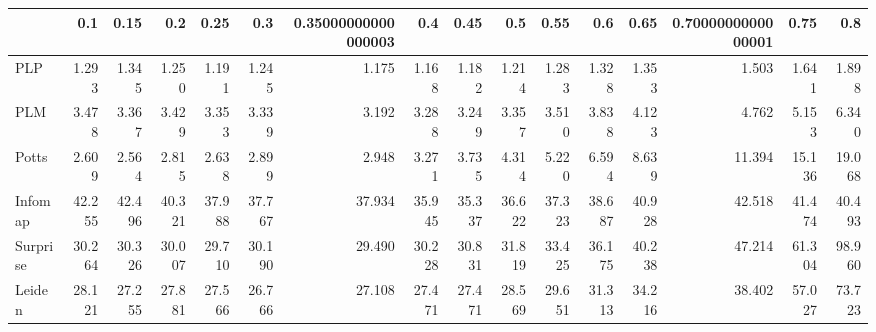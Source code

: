 \begin{tabular}{lrrrrrrrrrrrrrrr}
\toprule
{} &    0.1 &   0.15 &    0.2 &   0.25 &    0.3 & 0.35000000000000003 &    0.4 &   0.45 &    0.5 &   0.55 &    0.6 &   0.65 & 0.7000000000000001 &   0.75 &    0.8 \\
\midrule
PLP      &  1.293 &  1.345 &  1.250 &  1.191 &  1.245 &               1.175 &  1.168 &  1.182 &  1.214 &  1.283 &  1.328 &  1.353 &              1.503 &  1.641 &  1.898 \\
PLM      &  3.478 &  3.367 &  3.429 &  3.353 &  3.339 &               3.192 &  3.288 &  3.249 &  3.357 &  3.510 &  3.838 &  4.123 &              4.762 &  5.153 &  6.340 \\
Potts    &  2.609 &  2.564 &  2.815 &  2.638 &  2.899 &               2.948 &  3.271 &  3.735 &  4.314 &  5.220 &  6.594 &  8.639 &             11.394 & 15.136 & 19.068 \\
Infomap  & 42.255 & 42.496 & 40.321 & 37.988 & 37.767 &              37.934 & 35.945 & 35.337 & 36.622 & 37.323 & 38.687 & 40.928 &             42.518 & 41.474 & 40.493 \\
Surprise & 30.264 & 30.326 & 30.007 & 29.710 & 30.190 &              29.490 & 30.228 & 30.831 & 31.819 & 33.425 & 36.175 & 40.238 &             47.214 & 61.304 & 98.960 \\
Leiden   & 28.121 & 27.255 & 27.881 & 27.566 & 26.766 &              27.108 & 27.471 & 27.471 & 28.569 & 29.651 & 31.313 & 34.216 &             38.402 & 57.027 & 73.723 \\
\bottomrule
\end{tabular}
